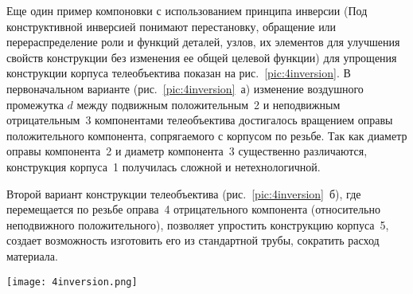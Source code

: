 Еще один пример компоновки с использованием принципа инверсии (Под конструктивной инверсией понимают перестановку, обращение или перераспределение роли и функций деталей, узлов, их элементов для улучшения свойств конструкции без изменения ее общей целевой функции) для упрощения конструкции корпуса телеобъектива показан на рис.~\ref{pic:4inversion}. В первоначальном варианте (рис.~\ref{pic:4inversion}~а) изменение воздушного промежутка $ d $ между подвижным положительным~2 и неподвижным отрицательным~3 компонентами телеобъектива достигалось вращением оправы положительного компонента, сопрягаемого с корпусом по резьбе. Так как диаметр оправы компонента~2 и диаметр компонента~3 существенно различаются, конструкция корпуса~1 получилась сложной и нетехнологичной.

Второй вариант конструкции телеобъектива (рис.~\ref{pic:4inversion}~б), где перемещается по резьбе оправа~4 отрицательного компонента (относительно неподвижного положительного), позволяет упростить конструкцию корпуса~5, создает возможность изготовить его из стандартной трубы, сократить расход материала.

\begin{figure*}[h!]
	\caption{Конструктивная инверсия элементов объектива}
	\texttt{[image: 4inversion.png]}
	\label{pic:4inversion}
\end{figure*}
